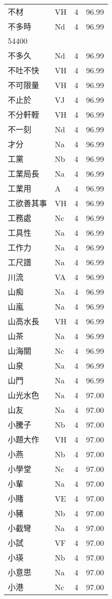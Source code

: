 \documentclass[twocolumn]{book}
\begin{document}
\begin{supertabular}{llrr}
不材 & VH & 4 &  96.99\\
不多時 & Nd & 4 &  96.99\\
54400\\
不多久 & Nd & 4 &  96.99\\
不吐不快 & VH & 4 &  96.99\\
不可限量 & VH & 4 &  96.99\\
不止於 & VJ & 4 &  96.99\\
不分軒輊 & VH & 4 &  96.99\\
不一刻 & Nd & 4 &  96.99\\
才分 & Na & 4 &  96.99\\
工黨 & Nb & 4 &  96.99\\
工業局長 & Na & 4 &  96.99\\
工業用 & A & 4 &  96.99\\
工欲善其事 & VH & 4 &  96.99\\
工務處 & Nc & 4 &  96.99\\
工具性 & Na & 4 &  96.99\\
工作力 & Na & 4 &  96.99\\
工尺譜 & Na & 4 &  96.99\\
川流 & VA & 4 &  96.99\\
山痴 & Na & 4 &  96.99\\
山嵐 & Na & 4 &  96.99\\
山高水長 & VH & 4 &  96.99\\
山茶 & Na & 4 &  96.99\\
山海關 & Nc & 4 &  96.99\\
山泉 & Na & 4 &  96.99\\
山門 & Na & 4 &  96.99\\
山光水色 & Na & 4 &  97.00\\
山友 & Na & 4 &  97.00\\
小騰子 & Nb & 4 &  97.00\\
小題大作 & VH & 4 &  97.00\\
小燕 & Nb & 4 &  97.00\\
小學堂 & Nc & 4 &  97.00\\
小輩 & Na & 4 &  97.00\\
小賭 & VE & 4 &  97.00\\
小豬 & Nb & 4 &  97.00\\
小截彎 & Na & 4 &  97.00\\
小試 & VF & 4 &  97.00\\
小瑛 & Nb & 4 &  97.00\\
小意思 & Na & 4 &  97.00\\
小港 & Nc & 4 &  97.00\\

\end{supertabular}
\end{document}
